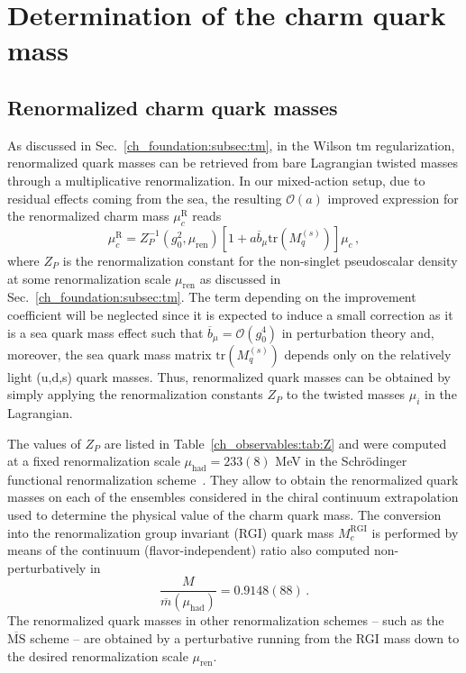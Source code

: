 \section{Determination of the charm quark mass}
\label{sec:mc}

\subsection{Renormalized charm quark masses}

%
As discussed in Sec.~\ref{ch_foundation:subsec:tm}, in the Wilson tm regularization, renormalized quark masses can be retrieved from bare Lagrangian twisted masses through a multiplicative renormalization. In our mixed-action setup, due to residual effects coming from the sea, the resulting $\mathcal{O}(a)$ improved expression for the renormalized  charm mass $\mu^{\textrm{R}}_c$ reads
\begin{equation}
	\mu^{\textrm{R}}_c=Z_P^{-1}(g_0^2,\mu_{\textrm{ren}})\left[1+a\overline{b}_\mu\textrm{tr}\left(M_q^{(s)}\right)\right]\mu_c\,,
	\label{eq:renormalized_charm_mass}
\end{equation}
where $Z_P$ is the renormalization constant for the non-singlet
pseudoscalar density at some renormalization scale $\mu_{\textrm{ren}}$ as discussed in Sec.~\ref{ch_foundation:subsec:tm}.
%
The term depending on the improvement coefficient  will be neglected since it is expected to induce a small correction as it is a sea quark mass effect such that $\overline{b}_{\mu} = \mathcal{O}(g_0^4)$ in perturbation theory and, moreover, the sea quark mass matrix $\textrm{tr}\left(M_q^{(s)}\right)$ depends only on the  relatively light (u,d,s) quark masses. Thus, renormalized quark masses can be obtained by simply applying the renormalization constants $Z_P$ to the twisted masses $\mu_i$ in the Lagrangian.
%

The values of $Z_P$ are listed in Table~\ref{ch_observables:tab:Z} and were computed at a fixed renormalization scale $\mu_{\textrm{had}}=233(8)$ MeV in the Schrödinger functional renormalization scheme~\citep{Campos:2018ahf}. They allow to obtain the renormalized quark masses on each of the ensembles considered in the chiral continuum extrapolation used to determine the physical value of the charm quark mass.
%
The conversion into the renormalization group invariant (RGI) quark mass $M_c^{\mathrm{RGI}}$ is performed by means of the continuum (flavor-independent) ratio also computed non-perturbatively in~\cite{Campos:2018ahf}
\begin{equation}
	\frac{M}{\overline{m}(\mu_{\mathrm{had}})} = 0.9148(88)\,.
	\label{eq:rgi_running_factor}
\end{equation}
%
The renormalized quark masses in other renormalization schemes -- such as the $\overline{\textrm{MS}}$ scheme -- are obtained by a perturbative running from the RGI mass down to the desired renormalization scale $\mu_{\textrm{ren}}$.
%

